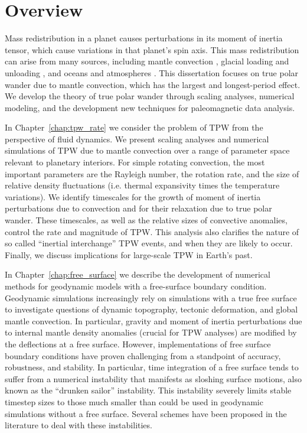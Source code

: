 \section{Overview}

Mass redistribution in a planet causes perturbations in its moment of inertia tensor,
which cause variations in that planet's spin axis. This mass redistribution can
arise from many sources, including mantle convection \citep{spada1992excitation}, 
glacial loading and unloading \citep{chen2013rapid}, and oceans and atmospheres \citep{munk1960rotation}.
This dissertation focuses on true polar wander due to mantle convection, which has the largest and longest-period effect.
We develop the theory of true polar wander through scaling analyses,
numerical modeling, and the development new techniques for paleomagnetic data analysis.

In Chapter~\ref{chap:tpw_rate} we consider the problem of TPW from the perspective of fluid dynamics.
We present scaling analyses and numerical simulations of TPW due to mantle convection over a range of parameter space relevant to planetary interiors. 
For simple rotating convection, the most important parameters are the Rayleigh number, the rotation rate, and the size of relative density fluctuations 
(i.e. thermal expansivity times the temperature variations). 
We identify timescales for the growth of moment of inertia perturbations due to convection and for their relaxation due to true polar wander. 
These timescales, as well as the relative sizes of convective anomalies, control the rate and magnitude of TPW.
This analysis also clarifies the nature of so called ``inertial interchange'' TPW events, and when they are likely to occur.
Finally, we discuss implications for large-scale TPW in Earth's past.

In Chapter~\ref{chap:free_surface} we describe the development of numerical methods
for geodynamic models with a free-surface boundary condition.
Geodynamic simulations increasingly rely on simulations with a true free surface to 
investigate questions of dynamic topography, tectonic deformation, and
global mantle convection. In particular, gravity and moment of inertia perturbations
due to internal mantle density anomalies (crucial for TPW analyses) are modified by the deflections at a free surface.
However, implementations of free surface boundary conditions 
have proven challenging from a standpoint of accuracy, robustness, and stability.
In particular, time integration of a free surface tends to suffer from a numerical instability
that manifests as sloshing surface motions, also known as the ``drunken sailor'' instability.
This instability severely limits stable timestep sizes to those much smaller than could be used
in geodynamic simulations without a free surface. 
Several schemes have been proposed in the literature to deal with these instabilities.

